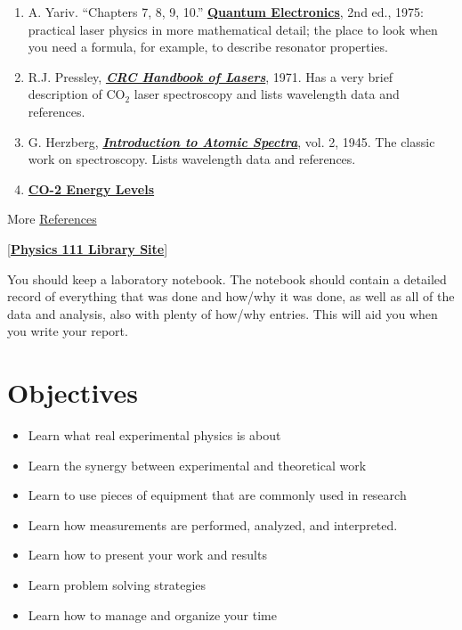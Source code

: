 \documentclass{../lab}
\begin{document}
\begin{enumerate}
    \item A. Yariv. ``Chapters 7, 8, 9, 10.'' \href{http://physics111.lib.berkeley.edu/Physics111/Reprints/CO2/Quantum\_Electronics2ed\_A-Yariv/CO2\_Quantum\%20Electronics\_index.html}{\textbf{Quantum Electronics}}, 2nd ed., 1975: practical laser physics in more mathematical detail; the place to look when you need a formula, for example, to describe resonator properties.

    \item R.J. Pressley, \emph{\href{http://physics111.lib.berkeley.edu/Physics111/Reprints/CO2/PRESSLEY\_Lasers/CO2\_Pressley\%20Lasers\_index.html}{\textbf{CRC Handbook of Lasers}}}, 1971. Has a very brief description of CO$_2$ laser spectroscopy and lists wavelength data and references.

    \item G. Herzberg, \emph{\href{http://physics111.lib.berkeley.edu/Physics111/Reprints/ATM/02-2ndEd-Atomic\_Spectra\_and\_Atomic\_Structure.pdf}{\textbf{Introduction to Atomic Spectra}}}, vol. 2, 1945. The classic work on spectroscopy. Lists wavelength data and references.

    \item \href{http://experimentationlab.berkeley.edu/sites/default/files/pdfs/CO\_2\%20Energy\%20Levels.pdf}{\textbf{CO-2 Energy Levels}}

\end{enumerate}

More \hyperref[sec:References]{References}

[\href{\LabReprints}{\textbf{Physics 111 Library Site}}]

You should keep a laboratory notebook. The notebook should contain a detailed record of everything that was done and how/why it was done, as well as all of the data and analysis, also with plenty of how/why entries. This will aid you when you write your report.

\section{Objectives}

\begin{itemize}
    \item Learn what real experimental physics is about

    \item Learn the synergy between experimental and theoretical work

    \item Learn to use pieces of equipment that are commonly used in research

    \item Learn how measurements are performed, analyzed, and interpreted.

    \item Learn how to present your work and results

    \item Learn problem solving strategies

    \item Learn how to manage and organize your time

\end{itemize}
\end{document}

